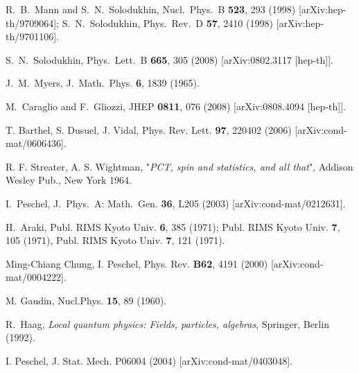 \documentclass[11pt]{article}
\begin{document}
\begin{thebibliography}{99}
  R.~B.~Mann and S.~N.~Solodukhin,
  Nucl.\ Phys.\  B {\bf 523}, 293 (1998)
  [arXiv:hep-th/9709064];
  S.~N.~Solodukhin,
  Phys.\ Rev.\  D {\bf 57}, 2410 (1998)
  [arXiv:hep-th/9701106].

  S.~N.~Solodukhin,
  Phys.\ Lett.\  B {\bf 665}, 305 (2008)
  [arXiv:0802.3117 [hep-th]].
  
J.~M.~Myers, J.\ Math.\ Phys. {\bf 6}, 1839 (1965).

  
  M.~Caraglio and F.~Gliozzi,
  JHEP {\bf 0811}, 076 (2008)
  [arXiv:0808.4094 [hep-th]].




 
 T. Barthel, S. Dusuel, J. Vidal, Phys. Rev. Lett. {\bf 97}, 220402 (2006) [arXiv:cond-mat/0606436]. 
 
 
 
 R. F. Streater, A. S. Wightman, "{\sl PCT, spin and statistics, and all that}", Addison Wesley Pub., New York 1964.


I.~Peschel, J.\ Phys.\ A: Math.\ Gen. {\bf 36}, L205 (2003) [arXiv:cond-mat/0212631]. 

 
  H.~Araki,
  Publ. RIMS  Kyoto Univ. {\bf 6}, 385 (1971); 
  Publ. RIMS Kyoto Univ. {\bf 7}, 105 (1971),
Publ. RIMS Kyoto Univ. {\bf 7}, 121 (1971). 

Ming-Chiang Chung, I. Peschel, Phys. Rev. {\bf B62}, 4191 (2000) [arXiv:cond-mat/0004222].

M. Gaudin, Nucl.Phys. {\bf 15}, 89 (1960).

  R.~Haag,
  {\sl Local quantum physics: Fields, particles, algebras}, 
 Springer, Berlin (1992). 

I. Peschel, J. Stat. Mech. P06004 (2004) [arXiv:cond-mat/0403048].


\end{thebibliography}
\end{document}
